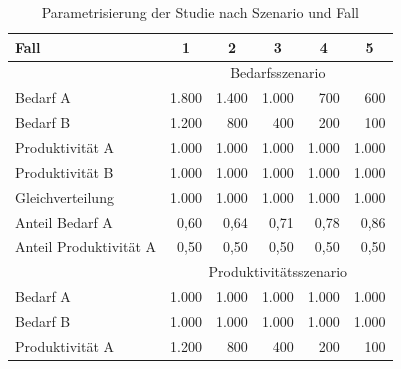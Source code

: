 \documentclass[justified,nobib,nohyper,symmetric,twoside]{tufte-book}
\begin{document}
\begin{table}[t]\label{tab:faelle}
   \caption{Parametrisierung der Studie nach Szenario und Fall}
   \begin{center}
   \begin{tabular}{lrrrrr}
   \hline
   Fall                   & \multicolumn{1}{c}{1} & \multicolumn{1}{c}{2} & \multicolumn{1}{c}{3} & \multicolumn{1}{c}{4} & \multicolumn{1}{c}{5} \\
   \hline\hline
                          & \multicolumn{5}{c}{Bedarfsszenario}                                                                                   \\
   \hline
   Bedarf A               & 1.800                 & 1.400                 & 1.000                 & 700                   & 600                   \\
   Bedarf B               & 1.200                 & 800                   & 400                   & 200                   & 100                   \\
   Produktivität A        & 1.000                 & 1.000                 & 1.000                 & 1.000                 & 1.000                 \\
   Produktivität B        & 1.000                 & 1.000                 & 1.000                 & 1.000                 & 1.000                 \\
   Gleichverteilung       & 1.000                 & 1.000                 & 1.000                 & 1.000                 & 1.000                 \\
   Anteil Bedarf A        & 0,60                  & 0,64                  & 0,71                  & 0,78                  & 0,86                  \\
   Anteil Produktivität A & 0,50                  & 0,50                  & 0,50                  & 0,50                  & 0,50                  \\
   \hline
                          & \multicolumn{5}{c}{Produktivitätsszenario}                                                                            \\
   \hline
   Bedarf A               & 1.000                 & 1.000                 & 1.000                 & 1.000                 & 1.000                 \\
   Bedarf B               & 1.000                 & 1.000                 & 1.000                 & 1.000                 & 1.000                 \\
   Produktivität A        & 1.200                 & 800                   & 400                   & 200                   & 100                   \\

\end{tabular}
\end{center}
\end{table}
\end{document}
